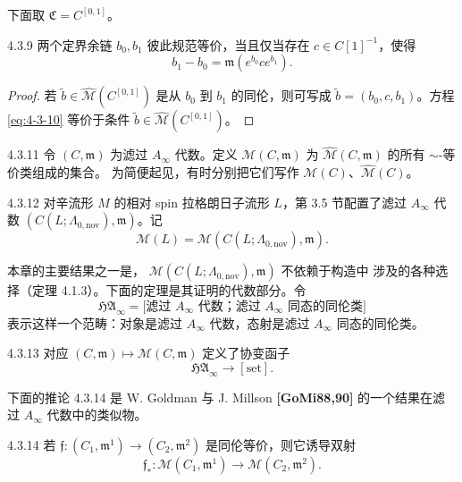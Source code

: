 下面取 $\mathfrak C=C^{[0,1]}$。

\begin{proposition}{4.3.9}\label{prop:4-3-9}
两个定界余链 $b_0,b_1$ 彼此规范等价，当且仅当存在
$c\in C[1]^{-1}$，使得
\begin{equation}
 b_1-b_0=\mathfrak m(e^{b_0}ce^{b_1}).
\tag{4.3.10}\label{eq:4-3-10}
\end{equation}
\end{proposition}

\begin{proof}
若 $\widetilde b\in\widehat{\mathcal M}(C^{[0,1]})$ 是从 $b_0$ 到
$b_1$ 的同伦，则可写成
$\widetilde b=(b_0,c,b_1)$。方程 \eqref{eq:4-3-10} 等价于条件
$\widetilde b\in\widehat{\mathcal M}(C^{[0,1]})$。
\end{proof}

\begin{definition}{4.3.11}\label{def:4-3-11}
令 $(C,\mathfrak m)$ 为滤过 $A_\infty$ 代数。定义
$\mathcal M(C,\mathfrak m)$ 为
$\widehat{\mathcal M}(C,\mathfrak m)$ 的所有 $\sim$-等价类组成的集合。
为简便起见，有时分别把它们写作
$\mathcal M(C)$、$\widehat{\mathcal M}(C)$。
\end{definition}

\begin{definition}{4.3.12}\label{def:4-3-12}
对辛流形 $M$ 的相对 spin 拉格朗日子流形 $L$，第 3.5 节配置了滤过
$A_\infty$ 代数
$(C(L;\Lambda_{0,\mathrm{nov}}),\mathfrak m)$。记
\[
 \mathcal M(L)=
 \mathcal M(C(L;\Lambda_{0,\mathrm{nov}}),\mathfrak m).
\]
\end{definition}

本章的主要结果之一是，
$\mathcal M(C(L;\Lambda_{0,\mathrm{nov}}),\mathfrak m)$ 不依赖于构造中
涉及的各种选择（定理 4.1.3）。下面的定理是其证明的代数部分。令
\[
 \mathfrak{HA}_\infty=
 \bigl[\text{滤过 $A_\infty$ 代数；滤过 $A_\infty$ 同态的同伦类}\bigr]
\]
表示这样一个范畴：对象是滤过 $A_\infty$ 代数，态射是滤过
$A_\infty$ 同态的同伦类。

\begin{theorem}{4.3.13}\label{thm:4-3-13}
对应
$(C,\mathfrak m)\longmapsto\mathcal M(C,\mathfrak m)$ 定义了协变函子
\[
 \mathfrak{HA}_\infty\longrightarrow[\mathrm{set}].
\]
\end{theorem}

下面的推论 4.3.14 是 W. Goldman 与 J. Millson
\textbf{[GoMi88,90]} 的一个结果在滤过 $A_\infty$ 代数中的类似物。

\begin{corollary}{4.3.14}\label{cor:4-3-14}
若
$\mathfrak f\colon(C_1,\mathfrak m^1)\to(C_2,\mathfrak m^2)$
是同伦等价，则它诱导双射
\[
 \mathfrak f_*\colon
 \mathcal M(C_1,\mathfrak m^1)\longrightarrow
 \mathcal M(C_2,\mathfrak m^2).
\]
\end{corollary}

